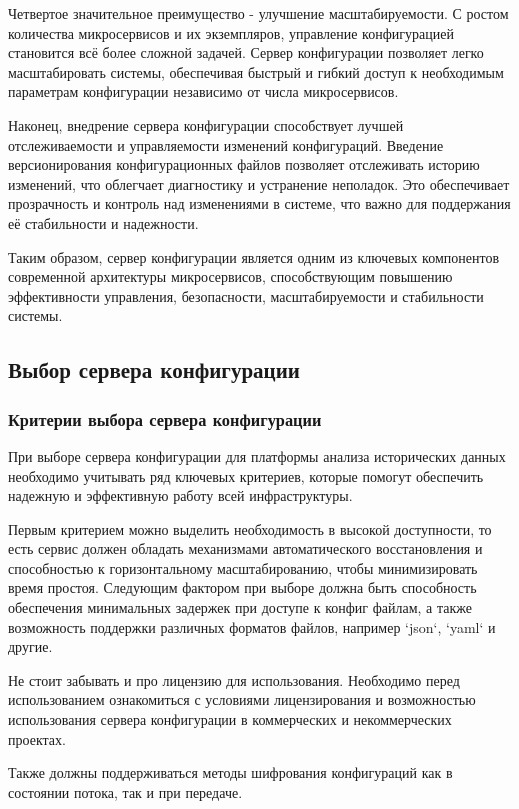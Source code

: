 Четвертое значительное преимущество - улучшение масштабируемости.
С ростом количества микросервисов и их экземпляров,
управление конфигурацией становится всё более сложной задачей.
Сервер конфигурации позволяет легко масштабировать
системы, обеспечивая быстрый и гибкий доступ к необходимым параметрам конфигурации независимо от числа микросервисов.

Наконец, внедрение сервера конфигурации способствует лучшей отслеживаемости и управляемости изменений конфигураций.
Введение версионирования конфигурационных файлов позволяет отслеживать историю изменений, что облегчает диагностику и
устранение неполадок.
Это обеспечивает прозрачность и контроль над изменениями в системе, что важно для поддержания её
стабильности и надежности.

Таким образом, сервер конфигурации является одним из ключевых компонентов современной архитектуры микросервисов,
способствующим
повышению эффективности управления, безопасности, масштабируемости и стабильности системы.

\subsection{Выбор сервера конфигурации}

\subsubsection{Критерии выбора сервера конфигурации}

При выборе сервера конфигурации для платформы анализа исторических данных необходимо учитывать ряд ключевых критериев,
которые помогут обеспечить надежную и эффективную работу всей инфраструктуры.

Первым критерием можно выделить необходимость в высокой доступности, то есть сервис должен обладать механизмами
автоматического
восстановления и способностью к горизонтальному масштабированию, чтобы минимизировать время простоя.
Следующим фактором при выборе должна быть способность обеспечения минимальных задержек при доступе к конфиг файлам,
а также возможность поддержки различных форматов файлов, например `json`, `yaml` и другие.

Не стоит забывать и про лицензию для использования.
Необходимо перед использованием ознакомиться с условиями
лицензирования и возможностью использования сервера конфигурации в коммерческих и некоммерческих проектах.

Также должны поддерживаться методы шифрования конфигураций как в состоянии потока, так и при передаче.

